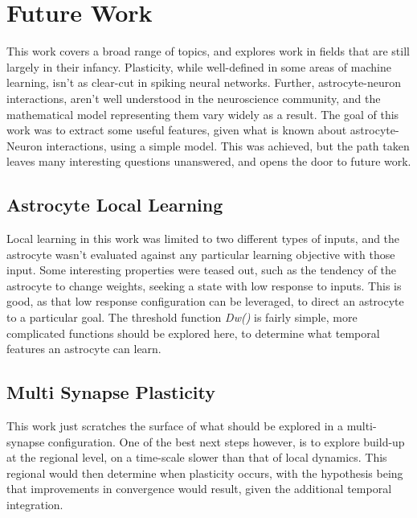 %

\chapter{Future Work} \label{chapter:future-work}
This work covers a broad range of topics, and explores work in fields that are
still largely in their infancy. Plasticity, while well-defined in some areas of
machine learning, isn't as clear-cut in spiking neural networks. Further,
astrocyte-neuron interactions, aren't well understood in the neuroscience
community, and the mathematical model representing them vary widely as a
result. The goal of this work was to extract some useful features, given what is
known about astrocyte-Neuron interactions, using a simple model. This was
achieved, but the path taken leaves many interesting questions unanswered, and
opens the door to future work.

\section{Astrocyte Local Learning}
Local learning in this work was limited to two different types of inputs, and
the astrocyte wasn't evaluated against any particular learning objective with
those input. Some interesting properties were teased out, such as the tendency of
the astrocyte to change weights, seeking a state with low \ca response to
inputs. This is good, as that low \ca response configuration can be leveraged,
to direct an astrocyte to a particular goal. The threshold function
\emph{Dw(\ca)} is fairly simple, more complicated functions should be explored
here, to determine what temporal features an astrocyte can learn.

\section{Multi Synapse Plasticity}
This work just scratches the surface of what should be explored in a
multi-synapse configuration. One of the best next steps however, is to explore
\ca build-up at the regional level, on a time-scale slower than that of local
dynamics. This regional \ca would then determine when plasticity occurs, with
the hypothesis being that improvements in convergence would result, given the
additional temporal integration. 

